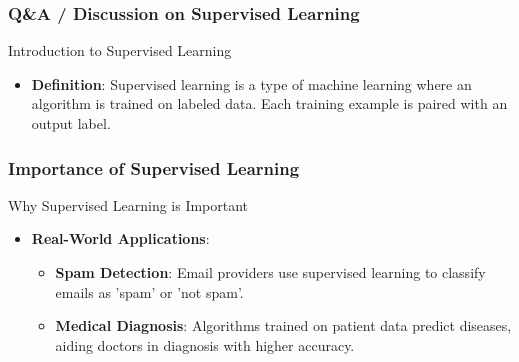 \documentclass[aspectratio=169]{beamer}
\begin{document}
\begin{frame}[fragile]
    \frametitle{Q\&A / Discussion on Supervised Learning}
    
    \begin{block}{Introduction to Supervised Learning}
        \begin{itemize}
            \item \textbf{Definition}: Supervised learning is a type of machine learning where an algorithm is trained on labeled data. Each training example is paired with an output label.
        \end{itemize}
    \end{block}
\end{frame}

\begin{frame}[fragile]
    \frametitle{Importance of Supervised Learning}
    
    \begin{block}{Why Supervised Learning is Important}
        \begin{itemize}
            \item \textbf{Real-World Applications}:
              \begin{itemize}
                  \item \textbf{Spam Detection}: Email providers use supervised learning to classify emails as 'spam' or 'not spam'.
                  \item \textbf{Medical Diagnosis}: Algorithms trained on patient data predict diseases, aiding doctors in diagnosis with higher accuracy.
              \end{itemize}
        \end{itemize}
    \end{block}
\end{frame}
\end{document}
